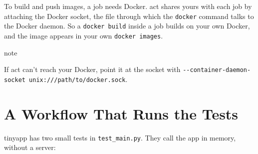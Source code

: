 To build and push images, a job needs Docker. act shares yours with each job by attaching the Docker socket, the file through which the \texttt{docker} command talks to the Docker daemon. So a \texttt{docker\ build} inside a job builds on your own Docker, and the image appears in your own \texttt{docker\ images}.

\begin{callout}{note}

If act can't reach your Docker, point it at the socket with \texttt{-}\allowbreak{}\texttt{-}\allowbreak{}\texttt{container-}\allowbreak{}\texttt{daemon-}\allowbreak{}\texttt{socket\ unix:}\allowbreak{}\texttt{/}\allowbreak{}\texttt{/}\allowbreak{}\texttt{/}\allowbreak{}\texttt{path/}\allowbreak{}\texttt{to/}\allowbreak{}\texttt{docker.}\allowbreak{}\texttt{sock}.

\end{callout}


\section{A Workflow That Runs the Tests}\label{06-your-first-pipeline:a-workflow-that-runs-the-tests}

tinyapp has two small tests in \texttt{test\_main.py}. They call the app in memory, without a server:

\begin{codeblock}

\begin{Shaded}
\begin{Highlighting}[]


\OperatorTok{=}


\OperatorTok{=}\NormalTok{)}
    \OperatorTok{==} 
    \NormalTok{ response.json()[}\NormalTok{] }\OperatorTok{==} 


\OperatorTok{/} \NormalTok{)}
    \OperatorTok{==}\NormalTok{ \{}\NormalTok{: }\NormalTok{\}}
    \OperatorTok{==}\NormalTok{ \{}\NormalTok{: }\NormalTok{\}}
\end{Highlighting}
\end{Shaded}

\end{codeblock}

